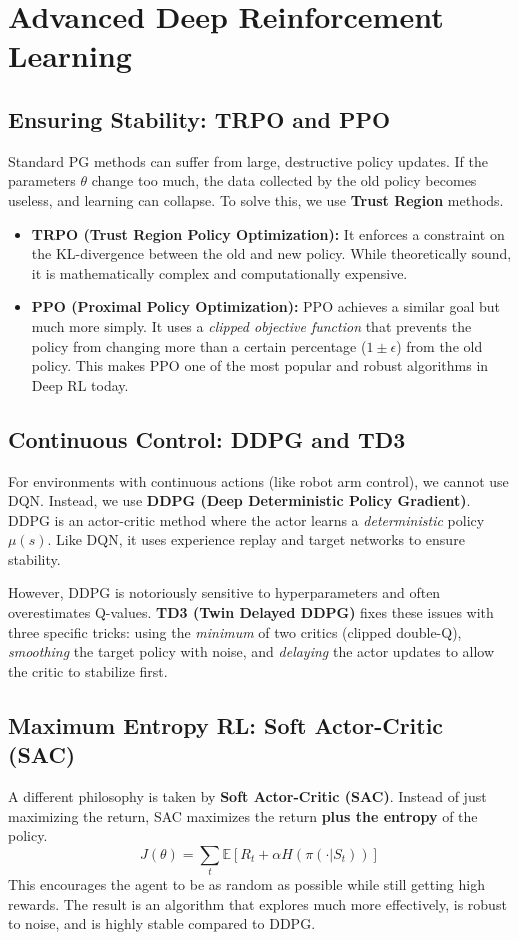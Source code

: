 \section{Advanced Deep Reinforcement Learning}

\subsection{Ensuring Stability: TRPO and PPO}
Standard PG methods can suffer from large, destructive policy updates. If the parameters $\theta$ change too much, the data collected by the old policy becomes useless, and learning can collapse. To solve this, we use \textbf{Trust Region} methods.
\begin{itemize}
    \item \textbf{TRPO (Trust Region Policy Optimization):} It enforces a constraint on the KL-divergence between the old and new policy. While theoretically sound, it is mathematically complex and computationally expensive.
    \item \textbf{PPO (Proximal Policy Optimization):} PPO achieves a similar goal but much more simply. It uses a \textit{clipped objective function} that prevents the policy from changing more than a certain percentage ($1 \pm \epsilon$) from the old policy. This makes PPO one of the most popular and robust algorithms in Deep RL today.
\end{itemize}

\subsection{Continuous Control: DDPG and TD3}
For environments with continuous actions (like robot arm control), we cannot use DQN. Instead, we use \textbf{DDPG (Deep Deterministic Policy Gradient)}. DDPG is an actor-critic method where the actor learns a \textit{deterministic} policy $\mu(s)$. Like DQN, it uses experience replay and target networks to ensure stability.

However, DDPG is notoriously sensitive to hyperparameters and often overestimates Q-values. \textbf{TD3 (Twin Delayed DDPG)} fixes these issues with three specific tricks: using the \textit{minimum} of two critics (clipped double-Q), \textit{smoothing} the target policy with noise, and \textit{delaying} the actor updates to allow the critic to stabilize first.

\subsection{Maximum Entropy RL: Soft Actor-Critic (SAC)}
A different philosophy is taken by \textbf{Soft Actor-Critic (SAC)}. Instead of just maximizing the return, SAC maximizes the return \textbf{plus the entropy} of the policy.
\[ J(\theta) = \sum_t \mathbb{E} [ R_t + \alpha H(\pi(\cdot|S_t)) ] \]
This encourages the agent to be as random as possible while still getting high rewards. The result is an algorithm that explores much more effectively, is robust to noise, and is highly stable compared to DDPG.


